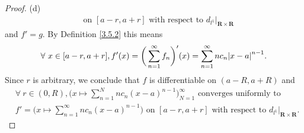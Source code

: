 \begin{proof}{(d)}
\begin{align*}
         & \text{ on } [a - r, a + r] \text{ with respect to } d_{l^1}|_{\mathbf{R} \times \mathbf{R}}
    \end{align*}
    and \(f' = g\).
    By Definition \ref{3.5.2} this means
    \[
        \forall\ x \in [a - r, a + r], f'(x) = \bigg(\sum_{n = 1}^\infty f_n\bigg)'(x) = \sum_{n = 1}^\infty n c_n \abs*{x - a}^{n - 1}.
    \]
    Since \(r\) is arbitrary, we conclude that \(f\) is differentiable on \((a - R, a + R)\) and
    \begin{align*}
         & \forall\ r \in (0, R), \bigg(x \mapsto \sum_{n = 1}^N n c_n (x - a)^{n - 1}\bigg)_{N = 1}^\infty \text{ converges uniformly to }                                  \\
         & f' = \bigg(x \mapsto \sum_{n = 1}^\infty n c_n (x - a)^{n - 1}\bigg) \text{ on } [a - r, a + r] \text{ with respect to } d_{l^1}|_{\mathbf{R} \times \mathbf{R}}.
    \end{align*}
\end{proof}

